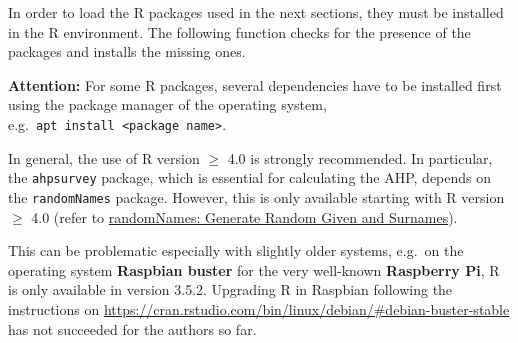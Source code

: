 \documentclass [oneside,10pt,a4paper,ngerman,BCOR10mm,headsepline,parindent,final]{scrartcl}
\begin{document}
In order to load the R packages used in the next sections, they must be
installed in the R environment. The following function checks for the
presence of the packages and installs the missing ones.

\textbf{Attention:} For some R packages, several dependencies have to be
installed first using the package manager of the operating system,
e.g.~\texttt{apt\ install\ \textless{}package\ name\textgreater{}}.

In general, the use of R version \(\geq\) 4.0 is strongly recommended.
In particular, the \texttt{ahpsurvey} package, which is essential for
calculating the AHP, depends on the \texttt{randomNames} package.
However, this is only available starting with R version \(\geq\) 4.0
(refer to
\href{https://cran.r-project.org/web/packages/randomNames/index.html}{randomNames:
Generate Random Given and Surnames}).

This can be problematic especially with slightly older systems, e.g.~on
the operating system \textbf{Raspbian buster} for the very well-known
\textbf{Raspberry Pi}, R is only available in version 3.5.2. Upgrading R
in Raspbian following the instructions on
\url{https://cran.rstudio.com/bin/linux/debian/\#debian-buster-stable}
has not succeeded for the authors so far.
\end{document}
